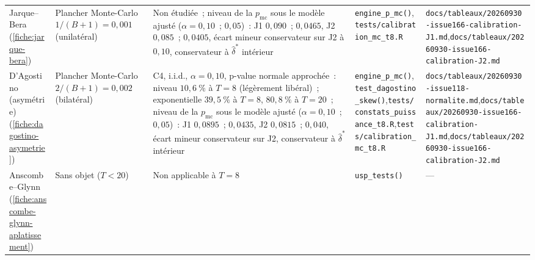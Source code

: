 \documentclass[a4paper,11pt]{article}
\newcommand{\code}[1]{\texttt{\small #1}}
\begin{document}
\begin{landscape}
\begin{center}
\begin{longtable}{@{}>{\raggedright\arraybackslash}p{2.5cm}>{\raggedright\arraybackslash}p{3.6cm}>{\raggedright\arraybackslash}p{4.0cm}>{\raggedright\arraybackslash}p{6.7cm}>{\raggedright\arraybackslash}p{7.2cm}@{}}
Jarque--Bera (\ref{fiche:jarque-bera}) & Plancher Monte-Carlo $1/(B+1) = 0{,}001$ (unilatéral) & Non étudiée~; niveau de la $p_{\mathrm{mc}}$ sous le modèle ajusté ($\alpha = 0{,}10$~; $0{,}05$)~: J1 $0{,}090$~; $0{,}0465$, J2 $0{,}085$~; $0{,}0405$, écart mineur conservateur sur J2 à $0{,}10$, conservateur à $\hat\delta^{*}$ intérieur & \code{engine\_p\_mc()},\newline \code{tests/calibration\_mc\_t8.R} & \code{docs/tableaux/}\newline \code{20260930-issue166-calibration-J1.md},\newline \code{docs/tableaux/}\newline \code{20260930-issue166-calibration-J2.md} \\
D'Agostino (asymétrie) (\ref{fiche:dagostino-asymetrie}) & Plancher Monte-Carlo $2/(B+1) = 0{,}002$ (bilatéral) & C4, i.i.d., $\alpha = 0{,}10$, p-value normale approchée~: niveau $10{,}6~\%$ à $T = 8$ (légèrement libéral)~; exponentielle $39{,}5~\%$ à $T = 8$, $80{,}8~\%$ à $T = 20$~; niveau de la $p_{\mathrm{mc}}$ sous le modèle ajusté ($\alpha = 0{,}10$~; $0{,}05$)~: J1 $0{,}0895$~; $0{,}0435$, J2 $0{,}0815$~; $0{,}040$, écart mineur conservateur sur J2, conservateur à $\hat\delta^{*}$ intérieur & \code{engine\_p\_mc()}, \code{test\_dagostino\_skew()},\newline \code{tests/constats\_puissance\_t8.R},\newline \code{tests/calibration\_mc\_t8.R} & \code{docs/tableaux/}\newline \code{20260930-issue118-normalite.md},\newline \code{docs/tableaux/}\newline \code{20260930-issue166-calibration-J1.md},\newline \code{docs/tableaux/}\newline \code{20260930-issue166-calibration-J2.md} \\
Anscombe--Glynn (\ref{fiche:anscombe-glynn-aplatissement}) & Sans objet ($T < 20$) & Non applicable à $T = 8$ & \code{usp\_tests()} & --- \\

\end{longtable}
\end{center}
\end{landscape}
\end{document}
